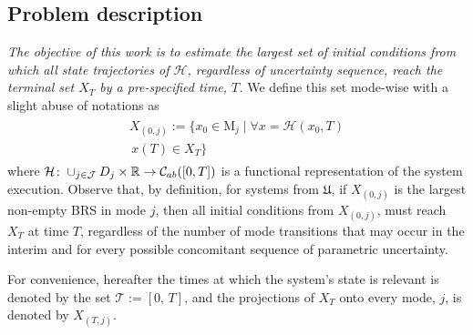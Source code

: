 \subsection{Problem description}
{\em The objective of this work is to estimate the largest set of initial conditions from which all state trajectories of $\mathcal H$, regardless of uncertainty sequence, reach the terminal set $X_T$ by a pre-specified time, $T$.}
We define this set mode-wise with a slight abuse of notations as
\begin{align}
\begin{aligned}
     X_{(0,j)}:=\{x_0\in \mathrm M_j\mid \forall x=\mathcal H(x_0,T) \\\,x(T)\in X_T\}
     \label{eq:brs}
\end{aligned}
\end{align}
where $\mathcal H\colon \cup_{j\in \mathcal J} D_j\times \mathbb{R}\rightarrow \mathcal C_{ab}([0,T])$ is a functional representation of the system execution.
Observe that, by definition, for systems from $\mathfrak{U}$, if $X_{(0,j)}$ is the largest non-empty BRS in mode $j$, then all initial conditions from $X_{(0,j)}$, must reach $X_T$ at time $T$, regardless of the number of mode transitions that may occur in the interim and for every possible concomitant sequence of parametric uncertainty.
\par
For convenience, hereafter the times at which the system's state is relevant is denoted by the set $\mathcal T:=[0,\,T]$, and the projections of $X_T$ onto every mode, $j$, is denoted by $X_{(T,j)}$.
